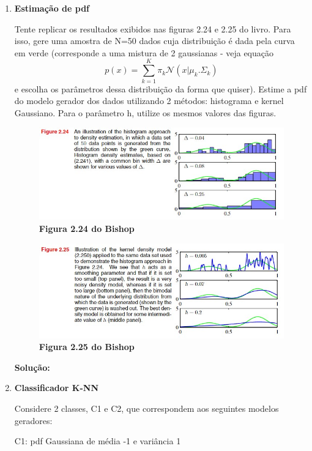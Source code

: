 \begin{enumerate}[label=E\arabic*]
\item \textbf{Estimação de pdf} \par
Tente replicar os resultados exibidos nas figuras 2.24 e 2.25 do livro. Para isso, gere uma amostra de N=50 dados cuja distribuição é dada pela curva em verde (corresponde a uma mistura de 2 gaussianas - veja equação 
$$p(x) = \sum_{k=1}^{K}\pi_k \mathcal{N} (x|\mu_k. \Sigma_k)$$ 
e escolha os parâmetros dessa distribuição da forma que quiser). Estime a pdf do modelo gerador dos dados utilizando 2 métodos: histograma e kernel Gaussiano. Para o parâmetro h, utilize os mesmos valores das figuras.
\begin{figure}[H]
    \caption*{\textbf{Figura 2.24 do Bishop}}
       \centering
       \includegraphics{bishop_224.jpg}
\end{figure}
\begin{figure}[H]
    \caption*{\textbf{Figura 2.25 do Bishop}}
       \centering
       \includegraphics{bishop_225.jpg}
\end{figure}
\par
\textbf{Solução:}



\item \textbf{Classificador K-NN} \par
Considere 2 classes, C1 e C2, que correspondem aos seguintes modelos geradores: 

C1: pdf Gaussiana de média -1 e variância 1


\end{enumerate}
